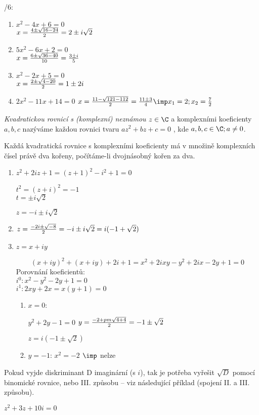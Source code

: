 /6:
\begin{enumerate}
\item $x^2 -  4x + 6 = 0$\\
$x = \frac{4 \pm \sqrt{16-24}}2 = 2 \pm i \sqrt 2$
\item $5x^2-6x+2 = 0$\\
$x= \frac{6\pm\sqrt{36-40}}{10} = \frac{3\pm i}5$
\item $x^2-2x+5 = 0$\\
$x = \frac{2\pm \sqrt{4-20}}2 = 1\pm 2i$
\item $2x^2 - 11 x + 14 = 0$
$x = \f{11-\sqrt{121-112}}2 = \f{11\pm3}4 \imp x_1=2;x_2=\f 72$
\end{enumerate}
\Def \emph{ Kvadratickou rovnicí s (komplexní) neznámou} $z\in\C$ a komplexními koeficienty $a,b,c$ nazýváme
každou rovnici tvaru $az^2+ bz+ c=0$ , kde $a,b, c \in\C;a \neq 0$. 

\V Každá kvadratická rovnice s komplexními koeficienty má v množině komplexních čísel právě dva
kořeny, počítáme-li dvojnásobný kořen za dva. 
\Pr
\begin{enumerate}
	\item 
		$z^2+2iz+1 = (z+1)^2-i^2+1 =0$

		$t^2 =(z+i)^2 = -1$\\
		$t=\pm i \sqrt 2$

		$z = -i \pm i\sqrt 2$
	\item $z = \frac{-2i\pm\sqrt{-8}}2 = -i \pm i\sqrt 2 = i(-1+\sqrt 2)$
	\item
		$z=x+iy$

		$$(x+iy)^2+(x+iy)+2i+1 = x^2+2ixy-y^2+2ix-2y+1 = 0$$
		Porovnání koeficientů:\\
		$i^0:  x^2-y^2-2y+1=0$\\ 
		$i^1:  2xy+2x=x(y+1)=0$\\ 
		\begin{enumerate}
			\item $x=0$:

				$y^2+2y-1=0$
				$y = \frac{-2+pm\sqrt{4+4}}2=-1\pm\sqrt 2$

				$z = i(-1\pm\sqrt 2)$
			\item $y=-1$:
				$x^2=-2$ $\imp$ nelze
		\end{enumerate}
\end{enumerate}
\Poz  Pokud vyjde diskriminant D imaginární (s $i$), tak je potřeba vyřešit $\sqrt D$ pomocí binomické
rovnice, nebo III. způsobu – viz následující příklad (spojení II. a III. způsobu). 

\Pr
$z^2+3z+10i = 0$

